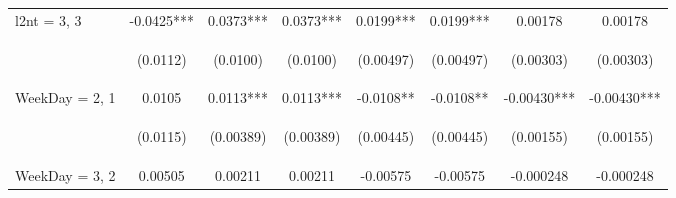 \documentclass[]{article}
\begin{document}
\begin{center}
\begin{tabular}{lccccccc}
l2nt = 3, 3 & -0.0425*** & 0.0373*** & 0.0373*** & 0.0199*** & 0.0199*** & 0.00178 & 0.00178 \\
\vspace{4pt} & \begin{footnotesize}(0.0112)\end{footnotesize} & \begin{footnotesize}(0.0100)\end{footnotesize} & \begin{footnotesize}(0.0100)\end{footnotesize} & \begin{footnotesize}(0.00497)\end{footnotesize} & \begin{footnotesize}(0.00497)\end{footnotesize} & \begin{footnotesize}(0.00303)\end{footnotesize} & \begin{footnotesize}(0.00303)\end{footnotesize} \\
WeekDay = 2, 1 & 0.0105 & 0.0113*** & 0.0113*** & -0.0108** & -0.0108** & -0.00430*** & -0.00430*** \\
\vspace{4pt} & \begin{footnotesize}(0.0115)\end{footnotesize} & \begin{footnotesize}(0.00389)\end{footnotesize} & \begin{footnotesize}(0.00389)\end{footnotesize} & \begin{footnotesize}(0.00445)\end{footnotesize} & \begin{footnotesize}(0.00445)\end{footnotesize} & \begin{footnotesize}(0.00155)\end{footnotesize} & \begin{footnotesize}(0.00155)\end{footnotesize} \\
WeekDay = 3, 2 & 0.00505 & 0.00211 & 0.00211 & -0.00575 & -0.00575 & -0.000248 & -0.000248 \\

\end{tabular}
\end{center}
\end{document}
